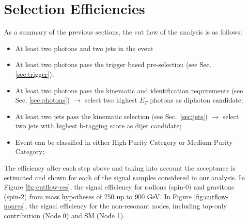 \section{Selection Efficiencies}
\label{sec:selection}

As a summary of the previous sections, the cut flow of the analysis is as follows:
\begin{itemize}
\item At least two photons and two jets in the event
\item At least two photons pass the trigger based pre-selection (see Sec. \ref{sec:trigger});
\item At least two photons pass the kinematic and identification requirements (see Sec. \ref{sec:photons}) $\to$ select two highest $E_{T}$ photons as diphoton candidate;
\item At least two jets pass the kinematic selection (see Sec.~\ref{sec:jets}) $\to$ select two jets with highest b-tagging score as dijet candidate;
\item Event can be classified in either High Purity Category or Medium Purity Category;
\end{itemize}

The efficiency after each step above and taking into account the acceptance is estimated and shown for each of the signal samples considered in our analysis. 
In Figure \ref{fig:cutflow-res}, the signal efficiency for radions (spin-0) and gravitons (spin-2) from mass hypotheses of 250 up to 900 GeV. 
In Figure \ref{fig:cutflow-nonres}, the signal efficiency for the non-resonant nodes, including top-only contribution (Node 0) and SM (Node 1). 


